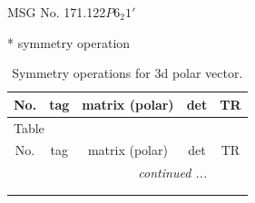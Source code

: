 \documentclass[fleqn,8pt]{jsarticle}
\begin{document}
\setcounter{MaxMatrixCols}{32}

\renewcommand{\tablename}{Table~}
\renewcommand{\figurename}{Figure~}
\begin{center}
\LARGE
MSG No. 171.122\quad$P6_{2}1'$
\end{center}
* symmetry operation
\renewcommand{\arraystretch}{1.3}
\begin{longtable}{ccccc}
\caption{Symmetry operations for 3d polar vector.}
 \\
 \hline \hline
No. & tag & matrix (polar) & det & TR \\ \hline \endfirsthead

\multicolumn{4}{l}{\tablename\ \thetable{}} \\
 \hline \hline
No. & tag & matrix (polar) & det & TR \\ \hline \endhead

 \hline \hline
\multicolumn{4}{r}{\footnotesize\it continued ...} \\ \endfoot

 \hline \hline
\multicolumn{4}{r}{} \\ \endlastfoot


\end{longtable}
\end{document}
